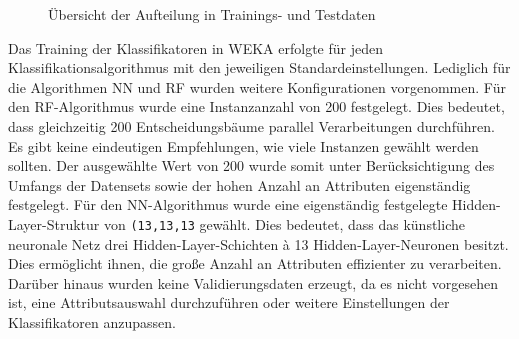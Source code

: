\begin{figure}[ht]
  \qquad
  \qquad
  \caption{Übersicht der Aufteilung in Trainings- und Testdaten\label{fig:splits}}
\end{figure}

Das Training der Klassifikatoren in WEKA erfolgte für jeden Klassifikationsalgorithmus mit den jeweiligen Standardeinstellungen. Lediglich für die Algorithmen NN und RF wurden weitere Konfigurationen vorgenommen. Für den RF-Algorithmus wurde eine Instanzanzahl von 200 festgelegt. Dies bedeutet, dass gleichzeitig 200 Entscheidungsbäume parallel Verarbeitungen durchführen. Es gibt keine eindeutigen Empfehlungen, wie viele Instanzen gewählt werden sollten. Der ausgewählte Wert von 200 wurde somit unter Berücksichtigung des Umfangs der Datensets sowie der hohen Anzahl an Attributen eigenständig festgelegt. Für den NN-Algorithmus wurde eine eigenständig festgelegte Hidden-Layer-Struktur von \texttt{(13,13,13} gewählt. Dies bedeutet, dass das künstliche neuronale Netz drei Hidden-Layer-Schichten à 13 Hidden-Layer-Neuronen besitzt. Dies ermöglicht ihnen, die große Anzahl an Attributen effizienter zu verarbeiten. Darüber hinaus wurden keine Validierungsdaten erzeugt, da es nicht vorgesehen ist, eine Attributsauswahl durchzuführen oder weitere Einstellungen der Klassifikatoren anzupassen.

